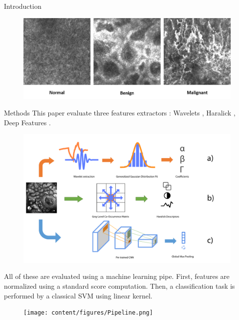 \documentclass[final]{beamer}
\newlength{\onecolwid}
\begin{document}
\begin{frame}[t]
\begin{columns}[t]
\begin{column}{\onecolwid}
\begin{block}{Introduction}
        	    \begin{figure}
                    \includegraphics[width=.9\linewidth]{content/figures/Data.png}
				\end{figure}
            \end{block}   
            \begin{block}{Methods}
                \justifying
                This paper evaluate three features extractors : Wavelets \cite{Halimi2017a}, Haralick \cite{Haralick1973}, Deep Features \cite{Litjens2017}.
                \begin{figure}[h]
                    \centering
                    \includegraphics[width=.9\linewidth]{content/figures/Methods.pdf}
                    \label{fig:method_used}
                \end{figure}
                All of these are evaluated using a machine learning pipe. First, features are normalized using a standard score computation. Then, a classification task is performed by a classical SVM using linear kernel.\par
                \begin{figure}[h]
                \centering
                    \texttt{[image: content/figures/Pipeline.png]}
                    \label{fig:pipeline}
                \end{figure}
            \end{block}       
        \end{column}
                      

\end{columns}
\end{frame}
\end{document}
